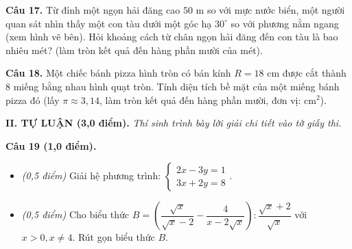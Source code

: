 \documentclass[11pt,a4paper]{article}
\begin{document}
\vspace{1.5mm}
\noindent
\begin{minipage}[c]{0.65\linewidth}
\textbf{Câu 17.} Từ đỉnh một ngọn hải đăng cao $50\text{ m}$ so với mực nước biển, một người quan sát nhìn thấy một con tàu dưới một góc hạ $30^\circ$ so với phương nằm ngang (xem hình vẽ bên). Hỏi khoảng cách từ chân ngọn hải đăng đến con tàu là bao nhiêu mét? (làm tròn kết quả đến hàng phần mười của mét).
\end{minipage}\hfill
\begin{minipage}[c]{0.32\linewidth}
\centering
{}
\end{minipage}

\vspace{1.5mm}
\textbf{Câu 18.} Một chiếc bánh pizza hình tròn có bán kính $R = 18\text{ cm}$ được cắt thành 8 miếng bằng nhau hình quạt tròn. Tính diện tích bề mặt của một miếng bánh pizza đó (lấy $\pi \approx 3{,}14$, làm tròn kết quả đến hàng phần mười, đơn vị: $\text{cm}^2$).

\vspace{4mm}
\noindent
\textbf{\large II. TỰ LUẬN (3,0 điểm).} \textit{Thí sinh trình bày lời giải chi tiết vào tờ giấy thi.}

\vspace{2mm}
\textbf{Câu 19 (1,0 điểm).}
\begin{itemize}
  \item[a)] \textit{(0,5 điểm)} Giải hệ phương trình: $\begin{cases} 2x - 3y = 1 \\ 3x + 2y = 8 \end{cases}$.
  \item[b)] \textit{(0,5 điểm)} Cho biểu thức $B = \left( \dfrac{\sqrt{x}}{\sqrt{x}-2} - \dfrac{4}{x - 2\sqrt{x}} \right) : \dfrac{\sqrt{x}+2}{\sqrt{x}}$ với $x > 0, x \ne 4$. Rút gọn biểu thức $B$.
\end{itemize}
\end{document}
